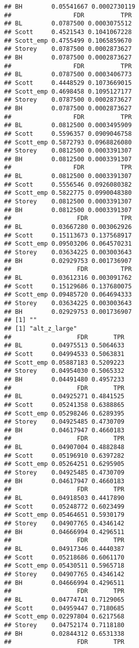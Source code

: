 \documentclass{article}\usepackage[]{graphicx}\usepackage[]{color}
\makeatletter
\newenvironment{kframe}{%
 \def\at@end@of@kframe{}%
 \ifinner\ifhmode%
  \def\at@end@of@kframe{\end{minipage}}%
  \begin{minipage}{\columnwidth}%
 \fi\fi%
 \def\FrameCommand##1{\hskip\@totalleftmargin \hskip-\fboxsep
 \colorbox{shadecolor}{##1}\hskip-\fboxsep
     \hskip-\linewidth \hskip-\@totalleftmargin \hskip\columnwidth}%
 \MakeFramed {\advance\hsize-\width
   \@totalleftmargin\z@ \linewidth\hsize
   \@setminipage}}%
 {\par\unskip\endMakeFramed%
 \at@end@of@kframe}
\newenvironment{knitrout}{}{} %
\makeatother
\begin{document}
\begin{knitrout}
\begin{kframe}
\begin{verbatim}
## BH        0.05541667 0.0002730119
##                 FDR          TPR
## BL        0.0787500 0.0003075512
## Scott     0.4521543 0.1041067228
## Scott_emp 0.4755499 0.1065859670
## Storey    0.0787500 0.0002873627
## BH        0.0787500 0.0002873627
##                 FDR          TPR
## BL        0.0787500 0.0003406773
## Scott     0.4448529 0.1073669015
## Scott_emp 0.4698458 0.1095127177
## Storey    0.0787500 0.0002873627
## BH        0.0787500 0.0002873627
##                 FDR          TPR
## BL        0.0812500 0.0003495909
## Scott     0.5596357 0.0909046758
## Scott_emp 0.5872793 0.0968826080
## Storey    0.0812500 0.0003391307
## BH        0.0812500 0.0003391307
##                 FDR          TPR
## BL        0.0812500 0.0003391307
## Scott     0.5556546 0.0926080382
## Scott_emp 0.5822775 0.0990048380
## Storey    0.0812500 0.0003391307
## BH        0.0812500 0.0003391307
##                  FDR         TPR
## BL        0.03667280 0.003062926
## Scott     0.15113673 0.137568917
## Scott_emp 0.09503206 0.064570231
## Storey    0.03634225 0.003003643
## BH        0.02929753 0.001736907
##                  FDR         TPR
## BL        0.03612316 0.003091762
## Scott     0.15129686 0.137680075
## Scott_emp 0.09485720 0.064694333
## Storey    0.03634225 0.003003643
## BH        0.02929753 0.001736907
## [1] ""
## [1] "alt_z_large"
##                  FDR       TPR
## BL        0.04975513 0.5064633
## Scott     0.04994533 0.5063831
## Scott_emp 0.05887183 0.5209223
## Storey    0.04954030 0.5065332
## BH        0.04491480 0.4957233
##                  FDR       TPR
## BL        0.04925271 0.4841525
## Scott     0.05241358 0.6388865
## Scott_emp 0.05298246 0.6289395
## Storey    0.04925485 0.4730709
## BH        0.04617947 0.4660183
##                  FDR       TPR
## BL        0.04907004 0.4882848
## Scott     0.05196910 0.6397282
## Scott_emp 0.05264251 0.6295905
## Storey    0.04925485 0.4730709
## BH        0.04617947 0.4660183
##                  FDR       TPR
## BL        0.04918503 0.4417890
## Scott     0.05248772 0.6023499
## Scott_emp 0.05464651 0.5930179
## Storey    0.04907765 0.4346142
## BH        0.04666994 0.4296511
##                  FDR       TPR
## BL        0.04917346 0.4440387
## Scott     0.05218686 0.6061170
## Scott_emp 0.05430511 0.5965718
## Storey    0.04907765 0.4346142
## BH        0.04666994 0.4296511
##                  FDR       TPR
## BL        0.04774741 0.7129065
## Scott     0.04959447 0.7180685
## Scott_emp 0.02297804 0.6217568
## Storey    0.04752174 0.7118180
## BH        0.02844312 0.6531338
##                  FDR       TPR

\end{verbatim}
\end{kframe}
\end{knitrout}
\end{document}
